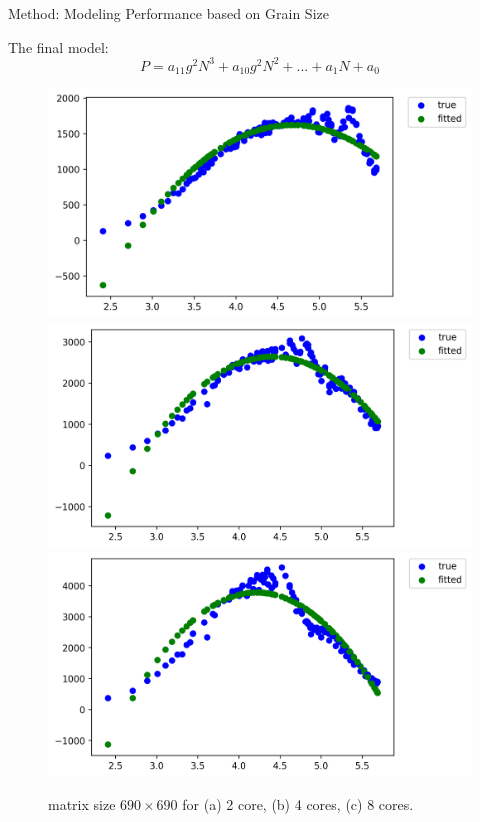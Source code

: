\documentclass[10pt]{beamer}
\begin{document}
\begin{frame}{Method: Modeling Performance based on Grain Size}
	\begin{outline}
		The final model: $$P=a_{11}g^2N^3+a_{10}g^2N^2+...+a_1N+a_0$$
	\begin{figure}[H]
		\centering
		{\includegraphics[scale=.3]{images/polyfit/fig_690_total_2.png}\label{fig18:a}}
		{\includegraphics[scale=.3]{images/polyfit/fig_690_total_4.png}\label{fig18:b}}
		{\includegraphics[scale=.3]{images/polyfit/fig_690_total_8.png}\label{fig18:c}}
		\caption{matrix size $690\times690$ for (a) 2 core, (b) 4 cores, (c) 8 cores.}	
		\label{fig18}
	\end{figure}
	\end{outline}
\end{frame}
\end{document}
